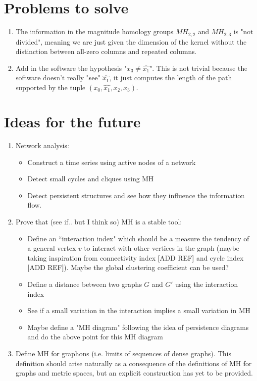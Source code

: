 \documentclass{article}
\begin{document}
	\section{Problems to solve}
	
	\begin{enumerate}
		\item The information in the magnitude homology groups $MH_{2,2}$ and $MH_{2,3}$ is "not divided", meaning we are just given the dimension of the kernel without the distinction between all-zero columns and repeated columns.
		\item Add in the software the hypothesis "$x_3 \neq \hat{x_1}$". This is not trivial because the software doesn't really "see" $\hat{x_1}$, it just computes the length of the path supported by the tuple $(x_0,\hat{x_1},x_2,x_3)$.
	\end{enumerate}

\section{Ideas for the future}

\begin{enumerate}
	\item Network analysis:
	\begin{itemize}
		\item Construct a time series using active nodes of a network
		\item Detect small cycles and cliques using MH
		\item Detect persistent structures and see how they influence the information flow.
	\end{itemize}

	\item Prove that (see if.. but I think so) MH is a stable tool:
	\begin{itemize}
		\item Define an ``interaction index" which should be a measure the tendency of a general vertex $v$ to interact with other vertices in the graph (maybe taking inspiration from connectivity index [ADD REF] and cycle index [ADD REF]). Maybe the global clustering coefficient can be used?
		\item Define a distance between two graphs $G$ and $G'$ using the interaction index
		\item See if a small variation in the interaction implies a small variation in MH
		\item Maybe define a "MH diagram" following the idea of persistence diagrams and do the above point for this MH diagram  
	\end{itemize}

	\item Define MH for graphons (i.e. limits of sequences of dense graphs). 
	This definition should arise naturally as a consequence of the definitions of MH for graphs and metric spaces, but an explicit construction has yet to be provided.
	
\end{enumerate}
\end{document}
